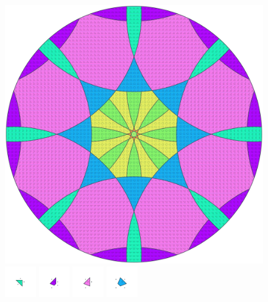 \documentclass[text.tex]{subfiles}
\begin{document}
\clearpage
\pagestyle{fancy}
\fancyhf{}
\begin{figure}[h!]
\centering
\includegraphics[width=1\textwidth]{img/results/circle8/circle8_181334_(4721_-1954alpha_2).pdf}
\includegraphics[width=0.12\textwidth]{img/results/circle8/circle8_181334_(4721_-1954alpha_2)_001.pdf}
\includegraphics[width=0.12\textwidth]{img/results/circle8/circle8_181334_(4721_-1954alpha_2)_002.pdf}
\includegraphics[width=0.12\textwidth]{img/results/circle8/circle8_181334_(4721_-1954alpha_2)_003.pdf}
\includegraphics[width=0.12\textwidth]{img/results/circle8/circle8_181334_(4721_-1954alpha_2)_004.pdf}

\end{figure}
\end{document}
